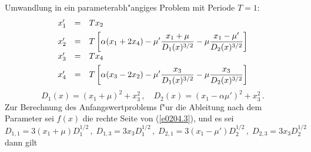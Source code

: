 \documentclass[12pt,a4paper,twoside,leqno]{article}
\begin{document}
Umwandlung in ein parameterabh"angiges Problem mit Periode $T = 1$:
\begin{equation}\label{e0204.3}
\ba{.}{rcl}
x'_1 &=&  Tx_2\\[1ex]
x'_2 &=& \dis T\left[\alpha(x_1 + 2x_4)
 - \mu'\frac{x_1 + \mu }{D_1(x)^{3/2}}
 - \mu \frac{x_1 - \mu'}{D_2(x)^{3/2}}\right]\\[1ex]
x'_3 &=& Tx_4\\[1ex]
x'_4 &=& \dis T\left[\alpha(x_3 - 2x_2)
- \mu'\frac{x_3}{D_1(x)^{3/2}}
- \mu \frac{x_3}{D_2(x)^{3/2}}\right]
\ea{.}
\end{equation}
\[
D_1(x) = (x_1 + \mu )^2 + x^2_3\,, \quad
D_2(x) = (x_1 - \alpha \mu ')^2 + x^2_3\,.
\]
Zur Berechnung des Anfangswertproblems f"ur die Ableitung nach dem Parameter
sei $f(x)$ die rechte Seite von (\ref{e0204.3}), und es sei
\[
D_{1,1} =  3(x_1+\mu)D^{1/2}_1\,, \; D_{1,3} =  3x_3D^{1/2}_1\,, \;
D_{2,1} =  3(x_1- \mu')D^{1/2}_2\,, \; D_{2,3} =  3x_3D^{1/2}_2
\]
dann gilt
\end{document}
